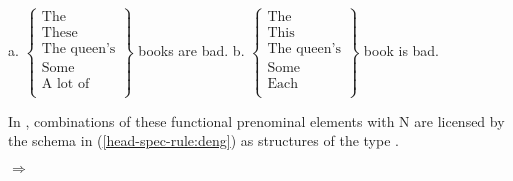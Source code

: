 \documentclass[output=paper,colorlinks,citecolor=brown]{langscibook}
\begin{document}
\ea \label{spec-ex:deng}
	a.  $\left\{\begin{array}{l}
		\text{The}\\
		\text{These}\\
		\text{The queen's}\\
		\text{Some}\\
		\text{A lot of}\\
		\end{array}\right\}$ books are bad.  
	\hspace{2em} b. $\left\{\begin{array}{l}
		\text{The}\\
		\text{This}\\
		\text{The queen's}\\
		\text{Some}\\
		\text{Each} \\
		\end{array}\right\}$ book is bad. 
\z


In , combinations of these functional prenominal elements with N are licensed by the schema in (\ref{head-spec-rule:deng}) as  structures of the type .

	
\ea \label{head-spec-rule:deng}
	 $\Rightarrow$ \\ 
\z 
\end{document}
